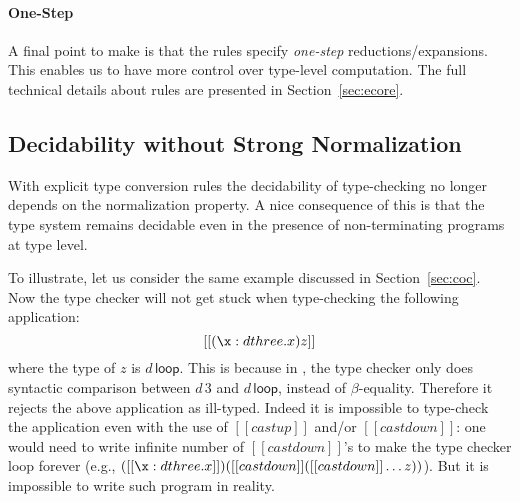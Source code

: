 \paragraph{One-Step}
A final point to make is that the \cast rules specify \emph{one-step}
reductions/expansions. 
This enables us to have more control over type-level
computation. The full technical details about \cast rules are presented
in Section~\ref{sec:ecore}.

\subsection{Decidability without Strong Normalization}

With explicit type conversion rules the decidability of type-checking 
no longer depends on the normalization property. 
A nice consequence of this is that the type system remains decidable
even in the presence of non-terminating programs at type level.

To illustrate, let us consider the same example discussed in
Section~\ref{sec:coc}. Now the type checker will not get stuck when
type-checking the following application:
\[ [[(\x: d three.x)z]] \]
where the type of $z$ is $d\,\mathsf{loop}$.  This is because in
\name, the type checker only does syntactic comparison between $d\,3$
and $d\,\mathsf{loop}$, instead of $\beta$-equality. Therefore it
rejects the above application as ill-typed. Indeed it is impossible to
type-check the application even with the use of $[[castup]]$ and/or
$[[castdown]]$: one would need to write infinite number of
$[[castdown]]$'s to make the type checker loop forever (e.g.,
$([[\x:d three.x]])([[castdown]]([[castdown]] \dots z))$). But it is
impossible to write such program in reality.

